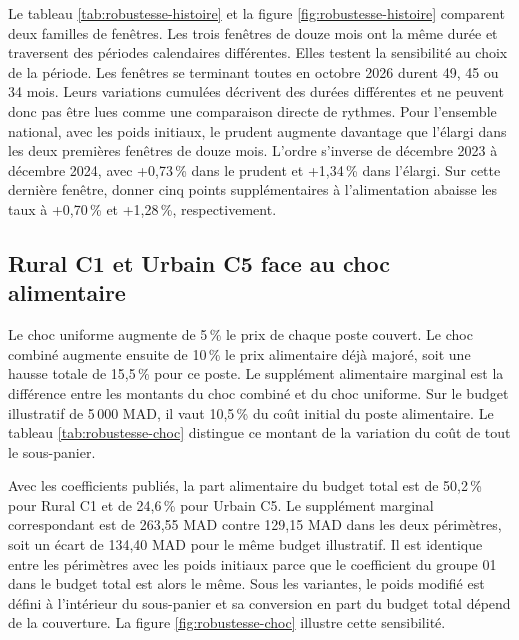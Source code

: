 Le tableau \ref{tab:robustesse-histoire} et la figure \ref{fig:robustesse-histoire} comparent deux familles de fenêtres. Les trois fenêtres de douze mois ont la même durée et traversent des périodes calendaires différentes. Elles testent la sensibilité au choix de la période. Les fenêtres se terminant toutes en octobre 2026 durent 49, 45 ou 34 mois. Leurs variations cumulées décrivent des durées différentes et ne peuvent donc pas être lues comme une comparaison directe de rythmes. Pour l'ensemble national, avec les poids initiaux, le prudent augmente davantage que l'élargi dans les deux premières fenêtres de douze mois. L'ordre s'inverse de décembre 2023 à décembre 2024, avec +0,73\,\% dans le prudent et +1,34\,\% dans l'élargi. Sur cette dernière fenêtre, donner cinq points supplémentaires à l'alimentation abaisse les taux à +0,70\,\% et +1,28\,\%, respectivement.

\clearpage

\subsection{Rural C1 et Urbain C5 face au choc alimentaire}

Le choc uniforme augmente de 5\,\% le prix de chaque poste couvert. Le choc combiné augmente ensuite de 10\,\% le prix alimentaire déjà majoré, soit une hausse totale de 15,5\,\% pour ce poste. Le supplément alimentaire marginal est la différence entre les montants du choc combiné et du choc uniforme. Sur le budget illustratif de 5\,000 MAD, il vaut 10,5\,\% du coût initial du poste alimentaire. Le tableau \ref{tab:robustesse-choc} distingue ce montant de la variation du coût de tout le sous-panier.

Avec les coefficients publiés, la part alimentaire du budget total est de 50,2\,\% pour Rural C1 et de 24,6\,\% pour Urbain C5. Le supplément marginal correspondant est de 263,55 MAD contre 129,15 MAD dans les deux périmètres, soit un écart de 134,40 MAD pour le même budget illustratif. Il est identique entre les périmètres avec les poids initiaux parce que le coefficient du groupe 01 dans le budget total est alors le même. Sous les variantes, le poids modifié est défini à l'intérieur du sous-panier et sa conversion en part du budget total dépend de la couverture. La figure \ref{fig:robustesse-choc} illustre cette sensibilité.

\clearpage

